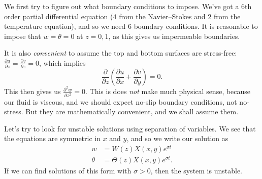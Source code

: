 \documentclass[a4paper]{article}
\begin{document}
We first try to figure out what boundary conditions to impose. We've got a $6$th order partial differential equation ($4$ from the Navier--Stokes and $2$ from the temperature equation), and so we need $6$ boundary conditions. It is reasonable to impose that $w = \theta = 0$ at $z = 0, 1$, as this gives us impermeable boundaries.

It is also \emph{convenient} to assume the top and bottom surfaces are stress-free: $\frac{\partial u}{\partial z} = \frac{\partial v}{\partial z} = 0$, which implies
\[
  \frac{\partial}{\partial z} \left(\frac{\partial u}{\partial x} + \frac{\partial v}{\partial y}\right) = 0.
\]
This then gives us $\frac{\partial^2 w}{\partial z^2} = 0$. This is does \emph{not} make much physical sense, because our fluid is viscous, and we should expect no-slip boundary conditions, not no-stress. But they are mathematically convenient, and we shall assume them.

Let's try to look for unstable solutions using separation of variables. We see that the equations are symmetric in $x$ and $y$, and so we write our solution as
\begin{align*}
  w &= W(z) X(x, y) e^{\sigma t}\\
  \theta &= \Theta(z) X(x, y) e^{\sigma t}.
\end{align*}
If we can find solutions of this form with $\sigma > 0$, then the system is unstable.
\end{document}
